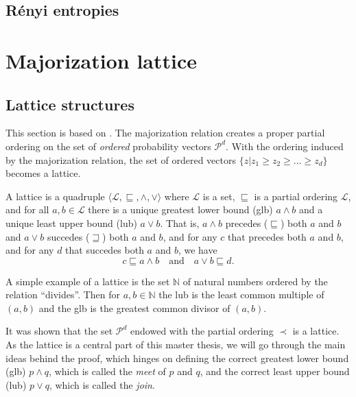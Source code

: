 \subsection{Rényi entropies}





\section{Majorization lattice} \label{sec:majorization_lattice}

\subsection{Lattice structures}

This section is based on \cite{cicalese_supermodularity_2002}. The majorization relation creates a proper partial ordering on the set of \textit{ordered} probability vectors $\mathcal{P}^d$. With the ordering induced by the majorization relation, the set of ordered vectors $\{z | z_1 \geq z_2 \geq ... \geq z_d\}$ becomes a lattice.

\begin{definition}[Lattice] \label{def:lattice} %
    A lattice is a quadruple $\langle \mathcal{L}, \sqsubseteq, \wedge, \vee \rangle$ where $\mathcal{L}$ is a set, $\sqsubseteq$ is a partial ordering $\mathcal{L}$, and for all $a, b \in \mathcal{L}$ there is a unique greatest lower bound (glb) $a \wedge b$ and a unique least upper bound (lub) $a \vee b$. That is, $a \wedge b$ precedes ($\sqsubseteq$) both $a$ and $b$ and $a \vee b$ succedes ($\sqsupseteq$) both $a$ and $b$, and for any $c$ that precedes both $a$ and $b$, and for any $d$ that succedes both $a$ and $b$, we have
    \begin{equation}
        c \sqsubseteq a \wedge b \quad \text{and} \quad a \vee b \sqsubseteq d.
    \end{equation}
\end{definition}

A simple example of a lattice is the set $\mathbb{N}$ of natural numbers ordered by the relation “divides”. Then for $a, b \in \mathbb{N}$ the lub is the least common multiple of $(a, b)$ and the glb is the greatest common divisor of $(a, b)$. %

It was shown that the set $\mathcal{P}^d$ endowed with the partial ordering $\prec$ is a lattice. As the lattice is a central part of this master thesis, we will go through the main ideas behind the proof, which hinges on defining the correct greatest lower bound (glb) $p \wedge q$, which is called the \textit{meet} of $p$ and $q$, and the correct least upper bound (lub) $p \vee q$, which is called the \textit{join}.

